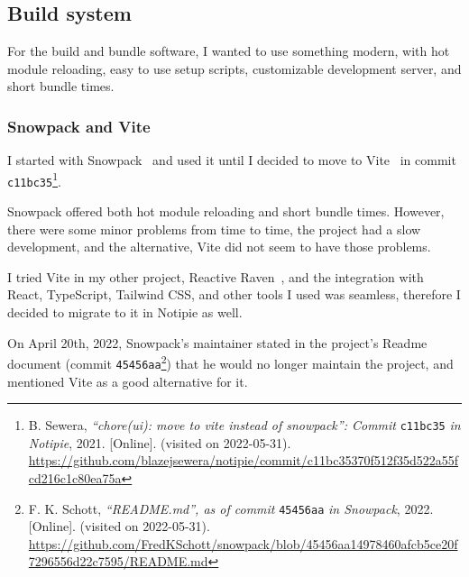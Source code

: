 \subsection{Build system}\label{build-system}

For the build and bundle software,
I wanted to use something modern,
with hot module reloading,
easy to use setup scripts,
customizable development server,
and short bundle times.

\subsubsection{Snowpack and Vite}\label{snowpack-and-vite}

I started with Snowpack~\cite{schott_snowpack_2021}
and used it until I decided to move to Vite~\cite{you_vite_2022}
in commit \texttt{c11bc35}\footnote{
  B. Sewera,
  \textit{``chore(ui): move to vite instead of snowpack'': Commit}
  \texttt{c11bc35}
  \textit{in Notipie},
  2021.
    [Online]. (visited on 2022-05-31).
  \url{https://github.com/blazejsewera/notipie/commit/c11bc35370f512f35d522a55fcd216c1c80ea75a}
}.

Snowpack offered both hot module reloading and short bundle times.
However, there were some minor problems from time to time,
the project had a slow development,
and the alternative,
Vite did not seem to have those problems.

I tried Vite in my other project,
Reactive Raven~\cite{sewera_reactive_2022},
and the integration with
React,
TypeScript,
Tailwind CSS,
and other tools I used was seamless,
therefore I decided to migrate to it in Notipie as well.

On April 20th, 2022,
Snowpack's maintainer stated in the project's Readme document
(commit \texttt{45456aa}\footnote{
  F. K. Schott,
  \textit{``README.md'', as of commit} \texttt{45456aa} \textit{in Snowpack}, 2022.
    [Online]. (visited on 2022-05-31).
  \url{https://github.com/FredKSchott/snowpack/blob/45456aa14978460afcb5ce20f7296556d22c7595/README.md}
})
that he would no longer maintain the project,
and mentioned Vite as a good alternative for it.
